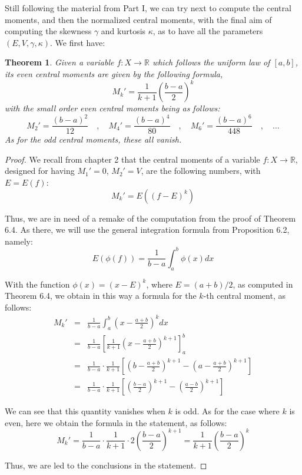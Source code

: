 \documentclass[12pt]{amsbook}
\newtheorem{theorem}{Theorem}[chapter]
\begin{document}
Still following the material from Part I, we can try next to compute the central moments, and then the normalized central moments, with the final aim of computing the skewness $\gamma$ and kurtosis $\kappa$, as to have all the parameters $(E,V,\gamma,\kappa)$. We first have:

\begin{theorem}
Given a variable $f:X\to\mathbb R$ which follows the uniform law of $[a,b]$, its even central moments are given by the following formula,
$$M_k'=\frac{1}{k+1}\left(\frac{b-a}{2}\right)^k$$
with the small order even central moments being as follows:
$$M_2'=\frac{(b-a)^2}{12}\quad,\quad 
M_4'=\frac{(b-a)^4}{80}\quad,\quad
M_6'=\frac{(b-a)^6}{448}\quad,\quad\ldots$$
As for the odd central moments, these all vanish.
\end{theorem}

\begin{proof}
We recall from chapter 2 that the central moments of a variable $f:X\to\mathbb R$, designed for having $M_1'=0$, $M_2'=V$, are the following numbers, with $E=E(f)$:
$$M_k'=E((f-E)^k)$$

Thus, we are in need of a remake of the computation from the proof of Theorem 6.4. As there, we will use the general integration formula from Proposition 6.2, namely:
$$E(\phi(f))=\frac{1}{b-a}\int_a^b\phi(x)dx$$

With the function $\phi(x)=(x-E)^k$, where $E=(a+b)/2$, as computed in Theorem 6.4, we obtain in this way a formula for the $k$-th central moment, as follows:
\begin{eqnarray*}
M_k'
&=&\frac{1}{b-a}\int_a^b\left(x-\frac{a+b}{2}\right)^kdx\\
&=&\frac{1}{b-a}\left[\frac{1}{k+1}\left(x-\frac{a+b}{2}\right)^{k+1}\right]_a^b\\
&=&\frac{1}{b-a}\cdot\frac{1}{k+1}\left[\left(b-\frac{a+b}{2}\right)^{k+1}-\left(a-\frac{a+b}{2}\right)^{k+1}\right]\\
&=&\frac{1}{b-a}\cdot\frac{1}{k+1}\left[\left(\frac{b-a}{2}\right)^{k+1}-\left(\frac{a-b}{2}\right)^{k+1}\right]
\end{eqnarray*}

We can see that this quantity vanishes when $k$ is odd. As for the case where $k$ is even, here we obtain the formula in the statement, as follows:
$$M_k'=\frac{1}{b-a}\cdot\frac{1}{k+1}\cdot 2\left(\frac{b-a}{2}\right)^{k+1}
=\frac{1}{k+1}\left(\frac{b-a}{2}\right)^k$$

Thus, we are led to the conclusions in the statement.
\end{proof}
\end{document}
